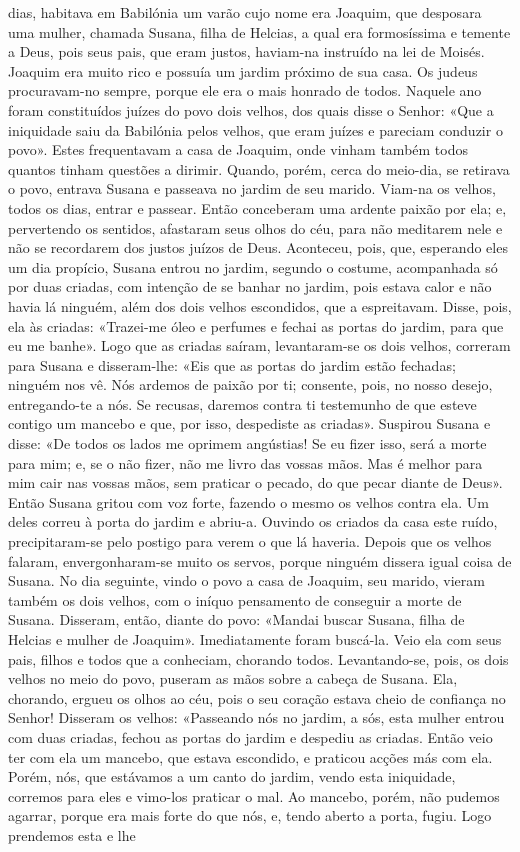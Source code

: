 \begin{paracol}{2}
{ dias, habitava em Babilónia um varão cujo nome era Joaquim, que desposara uma mulher, chamada Susana, filha de Helcias, a qual era formosíssima e temente a Deus, pois seus pais, que eram justos, haviam-na instruído na lei de Moisés. Joaquim era muito rico e possuía um jardim próximo de sua casa. Os judeus procuravam-no sempre, porque ele era o mais honrado de todos. Naquele ano foram constituídos juízes do povo dois velhos, dos quais disse o Senhor: «Que a iniquidade saiu da Babilónia pelos velhos, que eram juízes e pareciam conduzir o povo». Estes frequentavam a casa de Joaquim, onde vinham também todos quantos tinham questões a dirimir. Quando, porém, cerca do meio-dia, se retirava o povo, entrava Susana e passeava no jardim de seu marido. Viam-na os velhos, todos os dias, entrar e passear. Então conceberam uma ardente paixão por ela; e, pervertendo os sentidos, afastaram seus olhos do céu, para não meditarem nele e não se recordarem dos justos juízos de Deus. Aconteceu, pois, que, esperando eles um dia propício, Susana entrou no jardim, segundo o costume, acompanhada só por duas criadas, com intenção de se banhar no jardim, pois estava calor e não havia lá ninguém, além dos dois velhos escondidos, que a espreitavam. Disse, pois, ela às criadas: «Trazei-me óleo e perfumes e fechai as portas do jardim, para que eu me banhe». Logo que as criadas saíram, levantaram-se os dois velhos, correram para Susana e disseram-lhe: «Eis que as portas do jardim estão fechadas; ninguém nos vê. Nós ardemos de paixão por ti; consente, pois, no nosso desejo, entregando-te a nós. Se recusas, daremos contra ti testemunho de que esteve contigo um mancebo e que, por isso, despediste as criadas». Suspirou Susana e disse: «De todos os lados me oprimem angústias! Se eu fizer isso, será a morte para mim; e, se o não fizer, não me livro das vossas mãos. Mas é melhor para mim cair nas vossas mãos, sem praticar o pecado, do que pecar diante de Deus». Então Susana gritou com voz forte, fazendo o mesmo os velhos contra ela. Um deles correu à porta do jardim e abriu-a. Ouvindo os criados da casa este ruído, precipitaram-se pelo postigo para verem o que lá haveria. Depois que os velhos falaram, envergonharam-se muito os servos, porque ninguém dissera igual coisa de Susana. No dia seguinte, vindo o povo a casa de Joaquim, seu marido, vieram também os dois velhos, com o iníquo pensamento de conseguir a morte de Susana. Disseram, então, diante do povo: «Mandai buscar Susana, filha de Helcias e mulher de Joaquim». Imediatamente foram buscá-la. Veio ela com seus pais, filhos e todos que a conheciam, chorando todos. Levantando-se, pois, os dois velhos no meio do povo, puseram as mãos sobre a cabeça de Susana. Ela, chorando, ergueu os olhos ao céu, pois o seu coração estava cheio de confiança no Senhor! Disseram os velhos: «Passeando nós no jardim, a sós, esta mulher entrou com duas criadas, fechou as portas do jardim e despediu as criadas. Então veio ter com ela um mancebo, que estava escondido, e praticou acções más com ela. Porém, nós, que estávamos a um canto do jardim, vendo esta iniquidade, corremos para eles e vimo-los praticar o mal. Ao mancebo, porém, não pudemos agarrar, porque era mais forte do que nós, e, tendo aberto a porta, fugiu. Logo prendemos esta e lhe }
\end{paracol}
